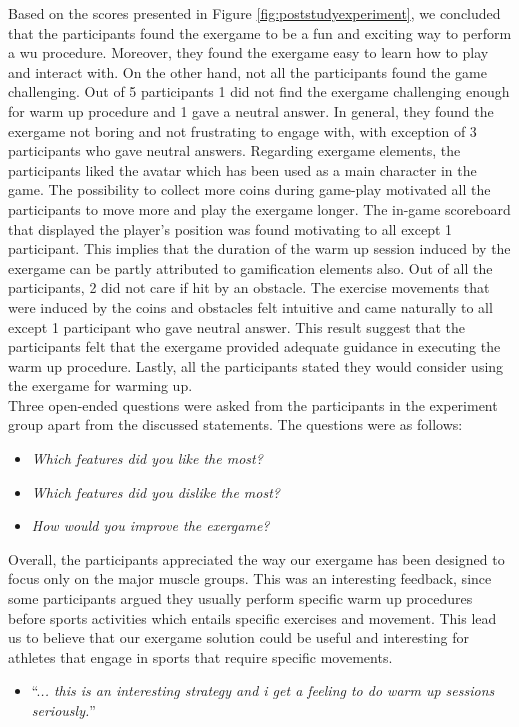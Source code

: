 Based on the scores presented in Figure \ref{fig:poststudyexperiment}, we concluded that the participants found the exergame to be a fun and exciting way to perform a \acrshort{wu} procedure. Moreover, they found the exergame easy to learn how to play and interact with. On the other hand, not all the participants found the game challenging. Out of 5 participants 1 did not find the exergame challenging enough for warm up procedure and 1 gave a neutral answer. In general, they found the exergame not boring and not frustrating to engage with, with exception of 3 participants who gave neutral answers.  Regarding exergame elements, the participants liked the avatar which has been used as a main character in the game. The possibility to collect more coins during game-play motivated all the participants to move more and play the exergame longer. The in-game scoreboard that displayed the player's position was found motivating to all except 1 participant. This implies that the duration of the warm up session induced by the exergame can be partly attributed to gamification elements also. Out of all the participants, 2 did not care if hit by an obstacle. The exercise movements that were induced by the coins and obstacles felt intuitive and came naturally to all except 1 participant who gave neutral answer. This result suggest that the participants felt that the exergame provided adequate guidance in executing the warm up procedure. Lastly, all the participants stated they would consider using the exergame for warming up. \\Three open-ended questions were asked from the participants in the experiment group apart from the discussed statements. The questions were as follows:
\begin{itemize}
\item \textit{Which features did you like the most?}
\item \textit{Which features did you dislike the most?}
\item \textit{How would you improve the exergame?}
\end{itemize}
Overall, the participants appreciated the way our exergame has been designed to focus only on the major muscle groups. This was an interesting feedback, since some participants argued they usually perform specific warm up procedures before sports activities which entails specific exercises and movement. This lead us to believe that our exergame solution could be useful and interesting for athletes that engage in sports that require specific movements.
\begin{itemize}
\item ``.\textit{.. this is an interesting strategy and i get a feeling to do warm up sessions seriously.}''
\end{itemize}
